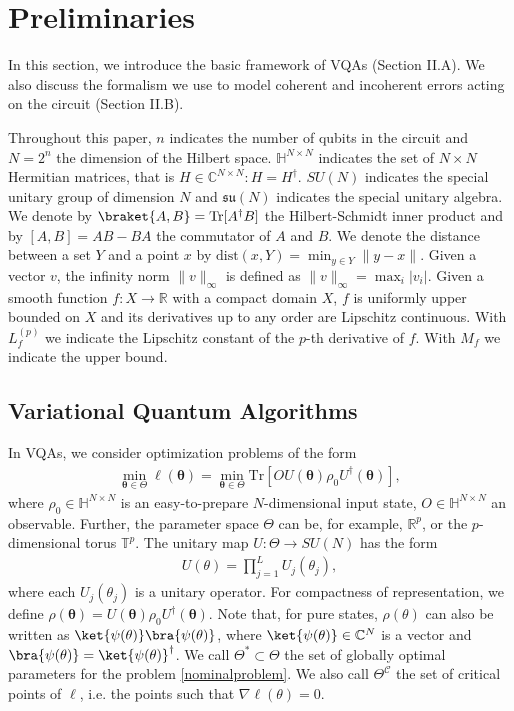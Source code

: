 \documentclass[letterpaper, 10 pt]{IEEEtran}  %
\newcommand{\Tr}{\mathrm{Tr}}
\newcommand{\dist}{\mathrm{dist}}
\begin{document}
\section{Preliminaries}
In this section, we introduce the basic framework of VQAs (Section II.A).
We also discuss the formalism we use to model coherent and incoherent errors acting on the circuit (Section II.B). 

Throughout this paper, $n$ indicates the number of qubits in the circuit and $N=2^n$ the dimension of the Hilbert space. $\mathbb{H}^{N \times N}$ indicates the set of $N \times N$ Hermitian matrices, that is $H \in \mathbb{C}^{N \times N} : H=H^\dagger$. $SU(N)$ indicates the special unitary group of dimension $N$ and $\mathfrak{su}(N)$ indicates the special unitary algebra.
We denote by $\braket{A,B}=\Tr[A^\dagger B]$ the Hilbert-Schmidt inner product and by $[A,B]=AB-BA$ the commutator of $A$ and $B$.
We denote the distance between a set $Y$ and a point $x$ by $\dist(x, Y)= \min_{y \in Y} \|y-x\|$. 
Given a vector $v$, the infinity norm $\|v\|_\infty$ is defined as $\|v\|_\infty=\max_i |v_i|$.
Given a smooth function $f: X \rightarrow \mathbb{R}$ with a compact domain $X$, $f$ is uniformly upper bounded on $X$ and its derivatives up to any order are Lipschitz continuous. 
With $L_f^{(p)}$ we indicate the Lipschitz constant of the $p$-th derivative of $f$. With $M_f$ we indicate the upper bound.  

\subsection{Variational Quantum Algorithms}

In VQAs, we consider optimization problems of the form 
\begin{align}
   \min_{\mathbf{\theta} \in \Theta} \ell (\mathbf{\theta}) = \min_{\mathbf{\theta} \in \Theta} \Tr[O U(\mathbf{\theta})\rho_0 U^\dagger(\mathbf{\theta})] \label{nominalproblem},
\end{align}
where $\rho_0 \in \mathbb{H}^{N \times N}$ is an easy-to-prepare $N$-dimensional input state, $O \in \mathbb{H}^{N \times N}$ an observable.
Further, the parameter space $\Theta$ can be, for example, $\mathbb{R}^p$, or the $p$-dimensional torus $\mathbb{T}^p$.
The unitary map $U: \Theta \rightarrow SU(N)$ has the form 
\begin{align}
   U(\theta)=\prod_{j=1}^L U_j(\theta_j), \label{qcirc}
\end{align}
where each $U_j(\theta_j)$ is a unitary operator.
For compactness of representation, we define $\rho(\mathbf{\theta})= U(\mathbf{\theta})\rho_0 U^\dagger(\mathbf{\theta})$. 
Note that, for pure states, $\rho(\theta)$ can also be written as $\ket{\psi(\theta)}\bra{\psi(\theta)}$, where $\ket{\psi(\theta)} \in \mathbb{C}^N$ is a vector and $\bra{\psi(\theta)}=\ket{\psi(\theta)}^\dagger$. 
We call $\Theta^* \subset \Theta$ the set of globally optimal parameters for the problem \eqref{nominalproblem}. We also call $\Theta^\mathcal{C}$ the set of critical points of $\ell$, i.e. the points such that $\nabla \ell(\theta)=0$.
\end{document}
